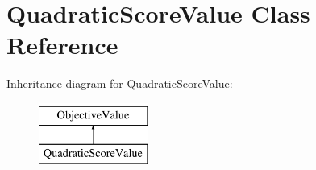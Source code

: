 \hypertarget{classQuadraticScoreValue}{\section{Quadratic\-Score\-Value Class Reference}
\label{classQuadraticScoreValue}
}
Inheritance diagram for Quadratic\-Score\-Value\-:\begin{figure}[H]
\begin{center}
\leavevmode
\includegraphics[height=2.000000cm]{classQuadraticScoreValue}
\end{center}
\end{figure}

